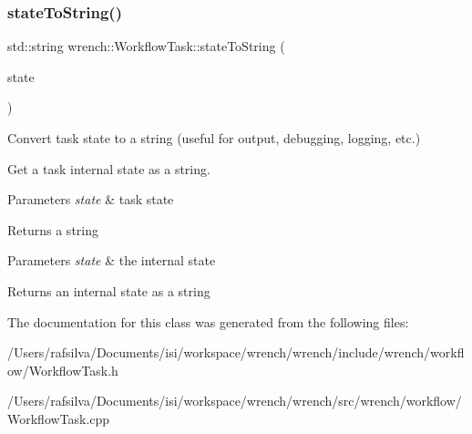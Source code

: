 \subsubsection{\texorpdfstring{state\+To\+String()}{stateToString()}}
{\footnotesize\ttfamily std\+::string wrench\+::\+Workflow\+Task\+::state\+To\+String (\begin{DoxyParamCaption}\item[{\hyperlink{classwrench_1_1_workflow_task_a1184f3d7aea21e1c87a9b17e84f1f92a}{Workflow\+Task\+::\+State}}]{state }\end{DoxyParamCaption})\hspace{0.3cm}{\ttfamily [static]}}



Convert task state to a string (useful for output, debugging, logging, etc.) 

Get a task internal state as a string.


\begin{DoxyParams}{Parameters}
{\em state} & task state \\
\hline
\end{DoxyParams}
\begin{DoxyReturn}{Returns}
a string
\end{DoxyReturn}

\begin{DoxyParams}{Parameters}
{\em state} & the internal state\\
\hline
\end{DoxyParams}
\begin{DoxyReturn}{Returns}
an internal state as a string 
\end{DoxyReturn}


The documentation for this class was generated from the following files\+:\begin{DoxyCompactItemize}
\item 
/\+Users/rafsilva/\+Documents/isi/workspace/wrench/wrench/include/wrench/workflow/Workflow\+Task.\+h\item 
/\+Users/rafsilva/\+Documents/isi/workspace/wrench/wrench/src/wrench/workflow/Workflow\+Task.\+cpp\end{DoxyCompactItemize}
